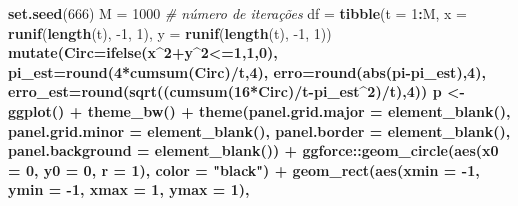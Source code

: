 \documentclass[
]{book}
\newenvironment{Shaded}{\begin{snugshade}}{\end{snugshade}}
\newcommand{\CommentTok}[1]{\textcolor[rgb]{0.56,0.35,0.01}{\textit{#1}}}
\newcommand{\DataTypeTok}[1]{\textcolor[rgb]{0.13,0.29,0.53}{#1}}
\newcommand{\DecValTok}[1]{\textcolor[rgb]{0.00,0.00,0.81}{#1}}
\newcommand{\KeywordTok}[1]{\textcolor[rgb]{0.13,0.29,0.53}{\textbf{#1}}}
\newcommand{\NormalTok}[1]{#1}
\newcommand{\OperatorTok}[1]{\textcolor[rgb]{0.81,0.36,0.00}{\textbf{#1}}}
\newcommand{\StringTok}[1]{\textcolor[rgb]{0.31,0.60,0.02}{#1}}
\begin{document}
\begin{Shaded}
\begin{Highlighting}[]
\KeywordTok{set.seed}\NormalTok{(}\DecValTok{666}\NormalTok{)}
\NormalTok{M =}\StringTok{ }\DecValTok{1000} \CommentTok{# número de iterações}
\NormalTok{df =}\StringTok{ }\KeywordTok{tibble}\NormalTok{(}\DataTypeTok{t =} \DecValTok{1}\OperatorTok{:}\NormalTok{M, }\DataTypeTok{x =} \KeywordTok{runif}\NormalTok{(}\KeywordTok{length}\NormalTok{(t), }\DecValTok{-1}\NormalTok{, }\DecValTok{1}\NormalTok{), }
            \DataTypeTok{y =} \KeywordTok{runif}\NormalTok{(}\KeywordTok{length}\NormalTok{(t), }\DecValTok{-1}\NormalTok{, }\DecValTok{1}\NormalTok{)) }\OperatorTok{%
\StringTok{  }\KeywordTok{mutate}\NormalTok{(}\DataTypeTok{Circ=}\KeywordTok{ifelse}\NormalTok{(x}\OperatorTok{^}\DecValTok{2}\OperatorTok{+}\NormalTok{y}\OperatorTok{^}\DecValTok{2}\OperatorTok{<=}\DecValTok{1}\NormalTok{,}\DecValTok{1}\NormalTok{,}\DecValTok{0}\NormalTok{), }
         \DataTypeTok{pi_est=}\KeywordTok{round}\NormalTok{(}\DecValTok{4}\OperatorTok{*}\KeywordTok{cumsum}\NormalTok{(Circ)}\OperatorTok{/}\NormalTok{t,}\DecValTok{4}\NormalTok{),}
         \DataTypeTok{erro=}\KeywordTok{round}\NormalTok{(}\KeywordTok{abs}\NormalTok{(pi}\OperatorTok{-}\NormalTok{pi_est),}\DecValTok{4}\NormalTok{),}
         \DataTypeTok{erro_est=}\KeywordTok{round}\NormalTok{(}\KeywordTok{sqrt}\NormalTok{((}\KeywordTok{cumsum}\NormalTok{(}\DecValTok{16}\OperatorTok{*}\NormalTok{Circ)}\OperatorTok{/}\NormalTok{t}\OperatorTok{-}\NormalTok{pi_est}\OperatorTok{^}\DecValTok{2}\NormalTok{)}\OperatorTok{/}\NormalTok{t),}\DecValTok{4}\NormalTok{))}
\NormalTok{p <-}\StringTok{ }\KeywordTok{ggplot}\NormalTok{() }\OperatorTok{+}\StringTok{ }\KeywordTok{theme_bw}\NormalTok{() }\OperatorTok{+}\StringTok{ }
\StringTok{        }\KeywordTok{theme}\NormalTok{(}\DataTypeTok{panel.grid.major =} \KeywordTok{element_blank}\NormalTok{(),}
            \DataTypeTok{panel.grid.minor =} \KeywordTok{element_blank}\NormalTok{(),}
            \DataTypeTok{panel.border =} \KeywordTok{element_blank}\NormalTok{(),}
            \DataTypeTok{panel.background =} \KeywordTok{element_blank}\NormalTok{()) }\OperatorTok{+}
\StringTok{        }\NormalTok{ggforce}\OperatorTok{::}\KeywordTok{geom_circle}\NormalTok{(}\KeywordTok{aes}\NormalTok{(}\DataTypeTok{x0 =} \DecValTok{0}\NormalTok{, }\DataTypeTok{y0 =} \DecValTok{0}\NormalTok{, }\DataTypeTok{r =} \DecValTok{1}\NormalTok{), }\DataTypeTok{color =} \StringTok{"black"}\NormalTok{) }\OperatorTok{+}
\StringTok{        }\KeywordTok{geom_rect}\NormalTok{(}\KeywordTok{aes}\NormalTok{(}\DataTypeTok{xmin =} \DecValTok{-1}\NormalTok{, }\DataTypeTok{ymin =} \DecValTok{-1}\NormalTok{, }\DataTypeTok{xmax =} \DecValTok{1}\NormalTok{, }\DataTypeTok{ymax =} \DecValTok{1}\NormalTok{), }
}
\end{Highlighting}
\end{Shaded}
\end{document}
